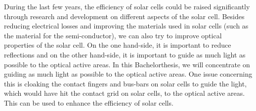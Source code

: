 During the last few years, the efficiency of solar cells could be raised significantly through research and development on different aspects of the solar cell. Besides reducing electrical losses and improving the materials used in solar cells (such as the material for the semi-conductor), we can also try to improve optical properties of the solar cell. On the one hand-side, it is important to reduce reflections and on the other hand-side, it is important to guide as much light as possible to the optical active areas. 
In this Bachelorthesis, we will concentrate on guiding as much light as possible to the optical active areas.
One issue concerning this is cloaking the contact fingers and bus-bars on solar cells to guide the light, which would have hit the contact grid on solar cells, to the optical active areas. This can be used to enhance the efficiency of solar cells. 

